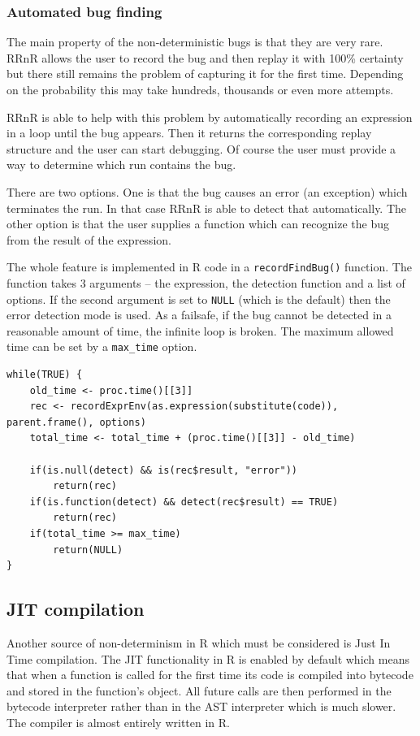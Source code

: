 \documentclass[thesis=M,english,hidelinks]{FITthesis}[2012/10/20]
\begin{document}
			\subsubsection{Automated bug finding}
			The main property of the non-deterministic bugs is that they are very rare. RRnR allows the user to record the bug and then replay it with 100\% certainty but there still remains the problem of capturing it for the first time. Depending on the probability this may take hundreds, thousands or even more attempts.\par
			
			RRnR is able to help with this problem by automatically recording an expression in a loop until the bug appears. Then it returns the corresponding replay structure and the user can start debugging. Of course the user must provide a way to determine which run contains the bug.\par
			
			There are two options. One is that the bug causes an error (an exception) which terminates the run. In that case RRnR is able to detect that automatically. The other option is that the user supplies a function which can recognize the bug from the result of the expression.\par
			
			The whole feature is implemented in R code in a \lstinline|recordFindBug()| function. The function takes 3 arguments -- the expression, the detection function and a list of options. If the second argument is set to \lstinline|NULL| (which is the default) then the error detection mode is used. As a failsafe, if the bug cannot be detected in a reasonable amount of time, the infinite loop is broken. The maximum allowed time can be set by a \lstinline|max_time| option.\par
			
\begin{lstlisting}[style=filestyle, caption={The automatic bug detection loop}]
while(TRUE) {
	old_time <- proc.time()[[3]]
	rec <- recordExprEnv(as.expression(substitute(code)), parent.frame(), options)
	total_time <- total_time + (proc.time()[[3]] - old_time)

	if(is.null(detect) && is(rec$result, "error"))
		return(rec)
	if(is.function(detect) && detect(rec$result) == TRUE)
		return(rec)
	if(total_time >= max_time)
		return(NULL)
}
\end{lstlisting}

		\subsection{JIT compilation}
		Another source of non-determinism in R which must be considered is Just In Time compilation. The JIT functionality in R is enabled by default which means that when a function is called for the first time its code is compiled into bytecode and stored in the function's object. All future calls are then performed in the bytecode interpreter rather than in the AST interpreter which is much slower. The compiler is almost entirely written in R.\par
		
\end{document}
